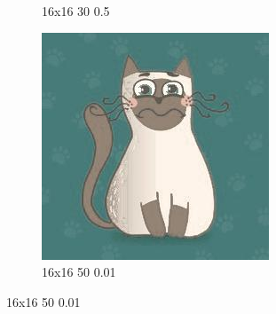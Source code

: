 \documentclass[12pt,a4paper]{article}
\begin{document}
\begin{figure}[H]
\begin{subfigure}{0.25\textwidth}
  \caption{16x16 30 0.5}
  \label{fig:8}
\end{subfigure}\hfil %
\begin{subfigure}{0.25\textwidth}
  \includegraphics[width=\linewidth]{images/cartoon/16-16-50-001}
  \caption{16x16 50 0.01}
  \label{fig:9}
\end{subfigure}


\end{figure}
\end{document}
